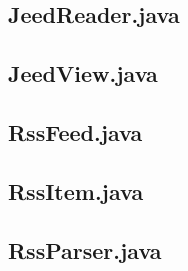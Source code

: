 \documentclass[a4paper, 12pt]{article}
\begin{document}
\newpage
\subsection{JeedReader.java}\label{JeedReader.java}
\begin{footnotesize}
  
\end{footnotesize}

\newpage
\subsection{JeedView.java}\label{JeedView.java}
\begin{footnotesize}
  
\end{footnotesize}

\newpage
\subsection{RssFeed.java}\label{RssFeed.java}
\begin{footnotesize}
  
\end{footnotesize}

\newpage
\subsection{RssItem.java}\label{RssItem.java}
\begin{footnotesize}
  
\end{footnotesize}

\newpage
\subsection{RssParser.java}\label{RssParser.java}
\begin{footnotesize}
  
\end{footnotesize}
  
\end{document}
